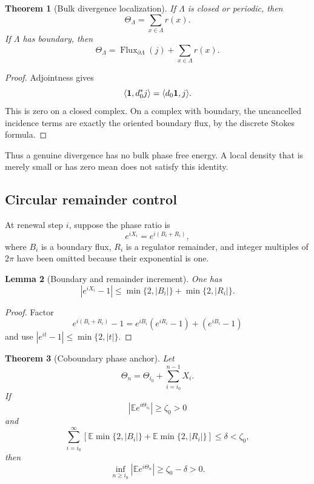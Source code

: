 \documentclass[11pt]{article}
\newtheorem{theorem}{Theorem}[section]
\newtheorem{lemma}[theorem]{Lemma}
\begin{document}
\begin{theorem}[Bulk divergence localization]
\label{thm:v11v73-divergence}
If \(\Lambda\) is closed or periodic, then
\[
                         \Theta_\Lambda=\sum_{x\in\Lambda}r(x).
                                                                  \tag{73.2}
\]
If \(\Lambda\) has boundary, then
\[
                         \Theta_\Lambda
                    =\operatorname{Flux}_{\partial\Lambda}(j)
                       +\sum_{x\in\Lambda}r(x).               \tag{73.3}
\]
\end{theorem}

\begin{proof}
Adjointness gives
\[
                         \langle{\bf1},d_0^*j\rangle
                              =\langle d_0{\bf1},j\rangle.
\]
This is zero on a closed complex.  On a complex with boundary, the
uncancelled incidence terms are exactly the oriented boundary flux,
by the discrete Stokes formula.
\end{proof}

Thus a genuine divergence has no bulk phase free energy.  A local
density that is merely small or has zero mean does not satisfy this
identity.

\subsection{Circular remainder control}

At renewal step \(i\), suppose the phase ratio is
\[
 e^{iX_i}
 =e^{i(B_i+R_i)},                                            \tag{73.4}
\]
where \(B_i\) is a boundary flux, \(R_i\) is a regulator remainder, and
integer multiples of \(2\pi\) have been omitted because their
exponential is one.

\begin{lemma}[Boundary and remainder increment]
\label{lem:v11v73-increment}
One has
\[
 |e^{iX_i}-1|
 \le\min\{2,|B_i|\}+\min\{2,|R_i|\}.                         \tag{73.5}
\]
\end{lemma}

\begin{proof}
Factor
\[
 e^{i(B_i+R_i)}-1
 =e^{iB_i}(e^{iR_i}-1)+(e^{iB_i}-1)
\]
and use \(|e^{it}-1|\le\min\{2,|t|\}\).
\end{proof}

\begin{theorem}[Coboundary phase anchor]
\label{thm:v11v73-anchor}
Let
\[
                         \Theta_n=\Theta_{i_0}
                                      +\sum_{i=i_0}^{n-1}X_i. \tag{73.6}
\]
If
\[
 |{\mathbb E}e^{i\Theta_{i_0}}|\ge\zeta_0>0                 \tag{73.7}
\]
and
\[
 \sum_{i=i_0}^{\infty}
 \left[
 {\mathbb E}\min\{2,|B_i|\}
 +{\mathbb E}\min\{2,|R_i|\}
 \right]\le\delta<\zeta_0,                                  \tag{73.8}
\]
then
\[
                         \inf_{n\ge i_0}
                         |{\mathbb E}e^{i\Theta_n}|
                              \ge\zeta_0-\delta>0.             \tag{73.9}
\]
\end{theorem}
\end{document}

